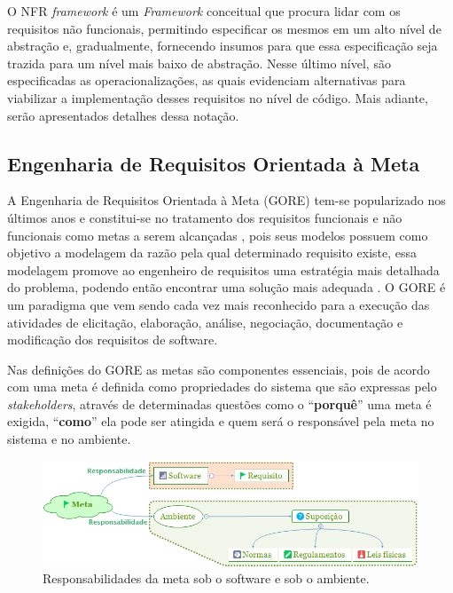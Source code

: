 O NFR \textit{framework} é um \textit{Framework} conceitual que procura lidar com os requisitos não funcionais, permitindo especificar os mesmos em um alto nível de abstração e, gradualmente, fornecendo insumos para que essa especificação seja trazida para um nível mais baixo de abstração. Nesse último nível, são especificadas as operacionalizações, as quais evidenciam alternativas para viabilizar a implementação desses requisitos no nível de código. Mais adiante, serão apresentados detalhes dessa notação.

\subsection{Engenharia de Requisitos Orientada à Meta}
\label{subsec:orientacaoMeta}

A Engenharia de Requisitos Orientada à Meta (GORE) tem-se popularizado nos últimos anos e constitui-se no tratamento dos requisitos funcionais e não funcionais como metas a serem alcançadas \cite{van2001goal}, pois seus modelos possuem como objetivo a modelagem da razão pela qual determinado requisito existe, essa modelagem promove ao engenheiro de requisitos uma estratégia mais detalhada do problema, podendo então encontrar uma solução mais adequada \cite{van2001goal}\cite{chung2012non}. O GORE é um paradigma que vem sendo cada vez mais reconhecido para a execução das atividades de elicitação, elaboração, análise, negociação, documentação e modificação dos requisitos de software\cite{van2001goal}.

Nas definições do GORE as metas são componentes essenciais, pois de acordo com \cite{van2001goal} uma meta é definida como propriedades do sistema que são expressas pelo \textit{stakeholders}, através de determinadas questões como o “\textbf{porquê}” uma meta é exigida, “\textbf{como}” ela pode ser atingida e quem será o responsável pela meta no sistema e no ambiente.

\begin{figure}[h]
	\centering
	\includegraphics[keepaspectratio=true,scale=0.8]{figuras/GORE.png}
	\caption{Responsabilidades da meta sob o software e sob o ambiente.}
	\label{Gore}
\end{figure}

